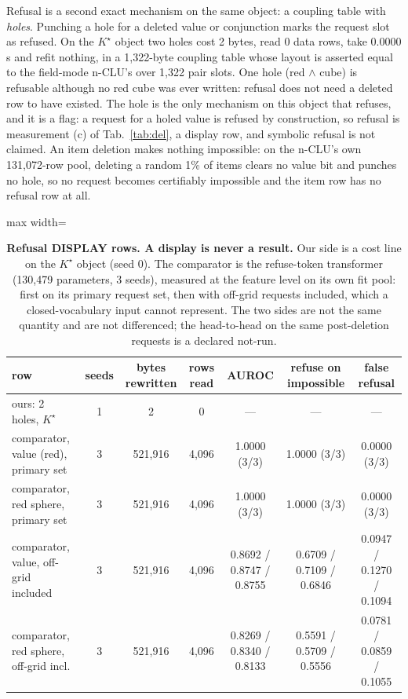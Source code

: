 \documentclass{article} %
\newcommand{\Kstar}{\ensuremath{K^{\star}}}
\begin{document}
Refusal is a second exact mechanism on the same object: a coupling table with \emph{holes}.
Punching a hole for a deleted value or conjunction marks the request slot as refused. On the
$\Kstar$ object two holes cost 2 bytes, read 0 data rows, take 0.0000 s and refit nothing, in
a 1,322-byte coupling table whose layout is asserted equal to the field-mode n-CLU's over 1,322 pair
slots. %
One hole (red $\wedge$ cube) is refusable although no red cube was ever written: refusal does
not need a deleted row to have existed. %
The hole is the only mechanism on this object that refuses, and it is a flag: a request for a
holed value is refused by construction, so refusal is measurement (c) of Tab.~\ref{tab:del}, a
display row, and symbolic refusal is not claimed. An item deletion makes nothing impossible: on the n-CLU's own 131,072-row pool, deleting a random
1\% of items clears no value bit and punches no hole, so no request becomes certifiably impossible
and the item row has no refusal row at all. %

\begin{table}[t]
\centering\small
\caption{\textbf{Refusal DISPLAY rows. A display is never a result.} Our side is a cost line
on the $\Kstar$ object (seed 0). The comparator is the refuse-token transformer (130,479
parameters, 3 seeds), measured at the feature level on its own fit pool: first on its primary
request set, then with off-grid requests included, which a closed-vocabulary input cannot
represent. The two sides are not the same quantity and are not differenced; the head-to-head on
the same post-deletion requests is a declared not-run.}
\label{tab:hole}
\setlength{\tabcolsep}{3pt}
\begin{adjustbox}{max width=\linewidth}\begin{tabular}{lcccccc}
\toprule
row & seeds & bytes rewritten & rows read & AUROC & refuse on impossible & false refusal \\
\midrule
ours: 2 holes, $\Kstar$ & 1 & 2 & 0 & --- & --- & --- \\ %
comparator, value (red), primary set & 3 & 521,916 & 4,096 & 1.0000 (3/3) & 1.0000 (3/3) & 0.0000 (3/3) \\
comparator, red sphere, primary set & 3 & 521,916 & 4,096 & 1.0000 (3/3) & 1.0000 (3/3) & 0.0000 (3/3) \\
comparator, value, off-grid included & 3 & 521,916 & 4,096 & 0.8692 / 0.8747 / 0.8755 & 0.6709 / 0.7109 / 0.6846 & 0.0947 / 0.1270 / 0.1094 \\
comparator, red sphere, off-grid incl. & 3 & 521,916 & 4,096 & 0.8269 / 0.8340 / 0.8133 & 0.5591 / 0.5709 / 0.5556 & 0.0781 / 0.0859 / 0.1055 \\
\bottomrule
\end{tabular}\end{adjustbox}
\end{table}
\end{document}
